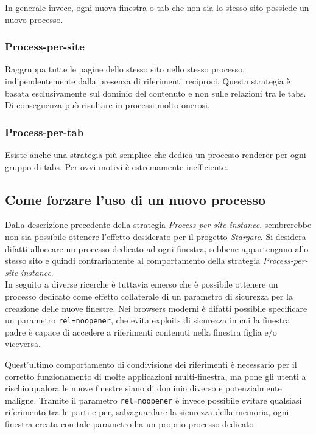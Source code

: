In generale invece, ogni nuova finestra o tab che non sia lo stesso sito possiede un nuovo processo.

\subsubsection{Process-per-site}

Raggruppa tutte le pagine dello stesso sito nello stesso processo, indipendentemente dalla presenza di riferimenti reciproci. Questa strategia è basata esclusivamente sul dominio del contenuto e non sulle relazioni tra le tabs. Di conseguenza può risultare in processi molto onerosi.

\subsubsection{Process-per-tab}

Esiste anche una strategia più semplice che dedica un processo renderer per ogni gruppo di tabs. Per ovvi motivi è estremamente inefficiente.

\subsection{Come forzare l'uso di un nuovo processo}\label{forzare-processo}

Dalla descrizione precedente della strategia \textit{Process-per-site-instance}, sembrerebbe non sia possibile ottenere l'effetto desiderato per il progetto \textit{Stargate}. Si desidera difatti alloccare un processo dedicato ad ogni finestra, sebbene appartengano allo stesso sito e quindi contrariamente al comportamento della strategia \textit{Process-per-site-instance}. \\

In seguito a diverse ricerche è tuttavia emerso che è possibile ottenere un processo dedicato come effetto collaterale di un parametro di sicurezza per la creazione delle nuove finestre. Nei browsers moderni è difatti possibile specificare un parametro \texttt{rel=noopener}, che evita exploits di sicurezza in cui la finestra padre è capace di accedere a riferimenti contenuti nella finestra figlia e/o viceversa. 

Quest'ultimo comportamento di condivisione dei riferimenti è necessario per il corretto funzionamento di molte applicazioni multi-finestra, ma pone gli utenti a rischio qualora le nuove finestre siano di dominio diverso e potenzialmente maligne. Tramite il parametro \texttt{rel=noopener} è invece possibile evitare qualsiasi riferimento tra le parti e per, salvaguardare la sicurezza della memoria, ogni finestra creata con tale parametro ha un proprio processo dedicato. \\

